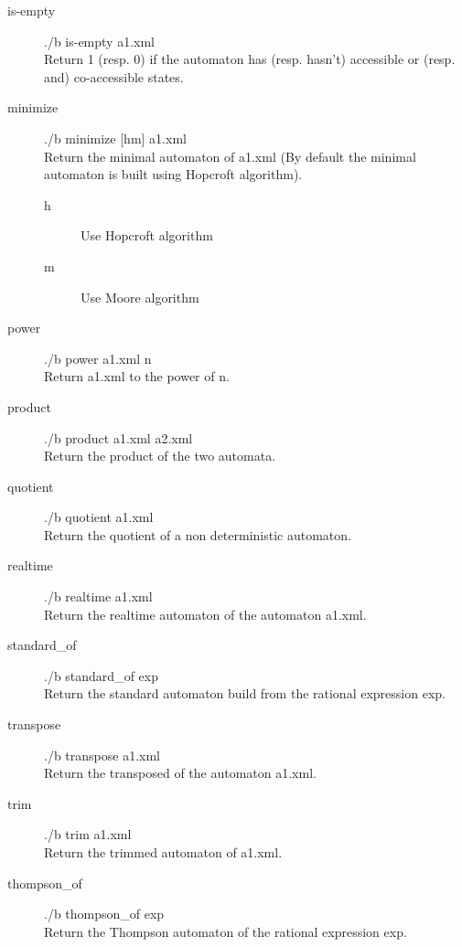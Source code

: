 \begin{description}
  \item [is-empty]
    ./b is-empty a1.xml\\
    Return 1 (resp. 0) if the automaton has (resp. hasn't) accessible
    or (resp. and) co-accessible states.

  \item [minimize]
    ./b minimize [hm] a1.xml\\
    Return the minimal automaton of a1.xml (By default the minimal
    automaton is built using Hopcroft algorithm).
    \begin{description}
      \item [h] Use Hopcroft algorithm
      \item [m] Use Moore algorithm
    \end{description}

  \item [power]
    ./b power a1.xml n\\
    Return a1.xml to the power of n.

  \item [product]
    ./b product a1.xml a2.xml\\
    Return the product of the two automata.

  \item [quotient]
    ./b quotient a1.xml\\
    Return the quotient of a non deterministic automaton.

  \item [realtime]
    ./b realtime a1.xml\\
    Return the realtime automaton of the automaton a1.xml.

  \item [standard\_of]
    ./b standard\_of exp\\
    Return the standard automaton build from the rational expression exp.

  \item [transpose]
    ./b transpose a1.xml\\
    Return the transposed of the automaton a1.xml.

  \item [trim]
    ./b trim a1.xml\\
    Return the trimmed automaton of a1.xml.

  \item [thompson\_of]
    ./b thompson\_of exp\\
    Return the Thompson automaton of the rational expression exp.
\end{description}
\newpage

